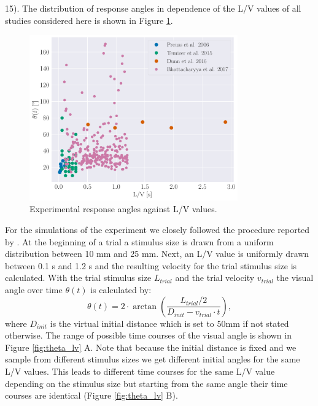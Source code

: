 \documentclass[a4paper,10pt,hidelinks]{scrreprt}
\begin{document}
	15\textdegree).
    The distribution of response angles in dependence of the L/V values of all studies considered here is shown in Figure \ref{fig:expm_theta_lv}.\\
    \begin{figure}[!h]
    	\begin{center}
			\includegraphics[width=0.8\textwidth]{figure_expm_theta_vs_lv.pdf}
    	\end{center}
    	\caption{Experimental response angles against L/V values.}
    	\label{fig:expm_theta_lv}
    \end{figure}
	For the simulations of the experiment we closely followed the procedure reported by 
	\cite{Bhattacharyya2017}.
	At the beginning of a trial a stimulus size is drawn from a uniform distribution between 10 mm and 25 mm.
	Next, an L/V value is uniformly drawn between 0.1 s and 1.2 s and the resulting velocity for the 
	trial stimulus size is calculated.
	With the trial stimulus size $L_{trial}$ and the trial velocity $v_{trial}$ the visual angle 
	over time $\theta(t)$ is calculated by:
	\begin{equation}
	\theta (t) = 2\cdot \arctan(\frac{L_{trial}/2}{D_{init} - v_{trial}\cdot t}),
	\label{eq:theta}
	\end{equation}
	where $D_{init}$ is the virtual initial distance which is set to 50mm if not stated otherwise.
    The range of possible time courses of the visual angle is shown in Figure \ref{fig:theta_lv} A.
    Note that because the initial distance is fixed and we sample from different stimulus sizes we get different initial angles for the same L/V values.
    This leads to different time courses for the same L/V value depending on the stimulus size but starting from the same angle their time courses are identical (Figure \ref{fig:theta_lv} B).
\end{document}
